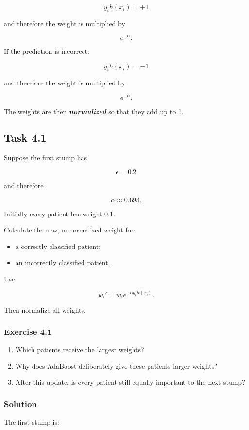 \documentclass[10pt]{article}
\begin{document}
\[
y_i h(x_i)=+1
\]

and therefore the weight is multiplied by

\[
e^{-\alpha}.
\]

If the prediction is incorrect:

\[
y_i h(x_i)=-1
\]

and therefore the weight is multiplied by

\[
e^{+\alpha}.
\]

The weights are then \textbf{\textit{normalized}} so that they add up to 1.

\subsection*{Task 4.1}
Suppose the first stump has

\[
\epsilon=0.2
\]

and therefore

\[
\alpha\approx0.693.
\]

Initially every patient has weight 0.1.

Calculate the new, unnormalized weight for:

\begin{itemize}
\item
a correctly classified patient;

\item
an incorrectly classified patient.

\end{itemize}
Use

\[
w_i'=w_i e^{-\alpha y_i h(x_i)}.
\]

Then normalize all weights.

\subsubsection*{Exercise 4.1}
\begin{enumerate}
\item
Which patients receive the largest weights?

\item
Why does AdaBoost deliberately give these patients larger weights?

\item
After this update, is every patient still equally important to the next stump?

\end{enumerate}
\begingroup\color{red}

\subsubsection*{Solution}
The first stump is:
\end{document}
